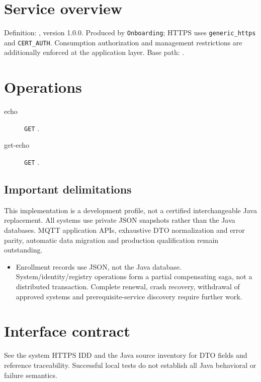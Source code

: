 \documentclass[a4paper]{arrowhead}
\begin{document}
\ArrowheadSetup
\section{Service overview}
Definition: , version 1.0.0. Produced by \texttt{Onboarding}; HTTPS uses \texttt{generic\_https} and \texttt{CERT\_AUTH}. Consumption authorization and management restrictions are additionally enforced at the application layer. Base path: .
\section{Operations}
\begin{description}
\item[echo] \texttt{GET} .
\item[get-echo] \texttt{GET} .
\end{description}
\subsection{Important delimitations}
This implementation is a development profile, not a certified interchangeable Java replacement. All systems use private JSON snapshots rather than the Java databases. MQTT application APIs, exhaustive DTO normalization and error parity, automatic data migration and production qualification remain outstanding.
\begin{itemize}
\item Enrollment records use JSON, not the Java database. System/identity/registry operations form a partial compensating saga, not a distributed transaction. Complete renewal, crash recovery, withdrawal of approved systems and prerequisite-service discovery require further work.
\end{itemize}
\section{Interface contract}
See the system HTTPS IDD and the Java source inventory for DTO fields and reference traceability. Successful local tests do not establish all Java behavioral or failure semantics.
\end{document}

